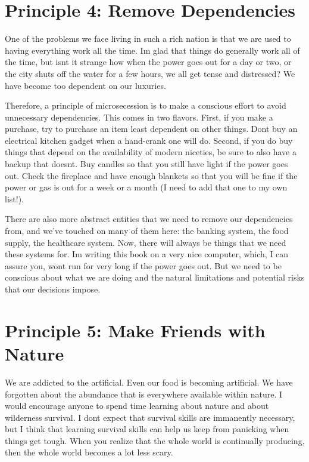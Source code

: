 \section{Principle 4: Remove Dependencies}

One of the problems we face living in such a rich nation is that we are
used to having everything work all the time. I{\textquotesingle}m glad
that things do generally work all of the time, but
isn{\textquotesingle}t it strange how when the power goes out for a day
or two, or the city shuts off the water for a few hours, we all get
tense and distressed? We have become too dependent on our luxuries.

Therefore, a principle of microsecession is to make a conscious effort
to avoid unnecessary dependencies. This comes in two flavors. First, if
you make a purchase, try to purchase an item least dependent on other
things. Don{\textquotesingle}t buy an electrical kitchen gadget when a
hand-crank one will do. Second, if you do buy things that depend on the
availability of modern niceties, be sure to also have a backup that
doesn{\textquotesingle}t. Buy candles so that you still have light if
the power goes out. Check the fireplace and have enough blankets so
that you will be fine if the power or gas is out for a week or a month
(I need to add that one to my own list!).

There are also more abstract entities that we need to remove our
dependencies from, and
we’ve touched on many of them here: the banking system, the food
supply, the healthcare system. Now, there will always be things that
we need these systems for. I{\textquotesingle}m writing this book on a
very nice computer, which, I can assure you, won{\textquotesingle}t run
for very long if the power goes out. But we need to be conscious about
what we are doing and the natural limitations and potential risks that
our decisions
impose.

\section{Principle 5: Make Friends with Nature}

We are addicted to the artificial. Even our food is becoming artificial.
We have forgotten about the abundance that is everywhere available
within nature. I would encourage anyone to spend time learning about
nature and about wilderness survival. I don{\textquotesingle}t expect
that survival skills are immanently necessary, but I think that
learning survival skills can help us
keep from panicking
when things get tough. When you realize that the whole world is
continually producing, then the whole world becomes a lot less scary.

